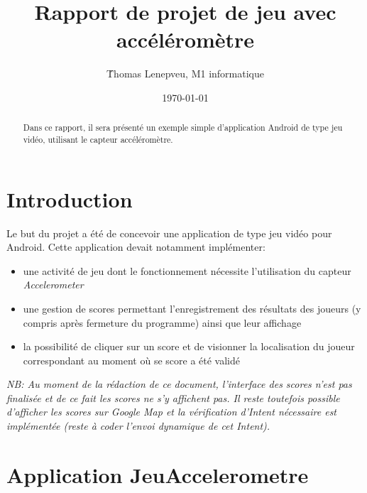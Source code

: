 \documentclass{article}
\title{Rapport de projet de jeu avec accéléromètre}
\author{\'Thomas Lenepveu, M1 informatique}
\date{\today}
\begin{document}
\maketitle %


\begin{abstract}
  Dans ce rapport, il sera présenté un exemple simple d'application Android de type jeu vidéo, utilisant le capteur accéléromètre.
\end{abstract}

\section{Introduction}

Le but du projet a été de concevoir une application de type jeu vidéo pour Android. Cette application devait notamment implémenter:

\begin{itemize}
\item une activité de jeu dont le fonctionnement nécessite l'utilisation du capteur \textit{Accelerometer}
\item une gestion de scores permettant l'enregistrement des résultats des joueurs (y compris après fermeture du programme)  ainsi que leur affichage
\item la possibilité de cliquer sur un score et de visionner la localisation du joueur correspondant au moment où se score a été validé
\end{itemize}

\textit{NB: Au moment de la rédaction de ce document, l'interface des scores n'est pas finalisée et de ce fait les scores ne s'y affichent pas. Il reste toutefois possible d'afficher les scores sur Google Map et la vérification d'Intent nécessaire est implémentée (reste à coder l'envoi dynamique de cet Intent).}


\section{Application JeuAccelerometre}
\end{document}
